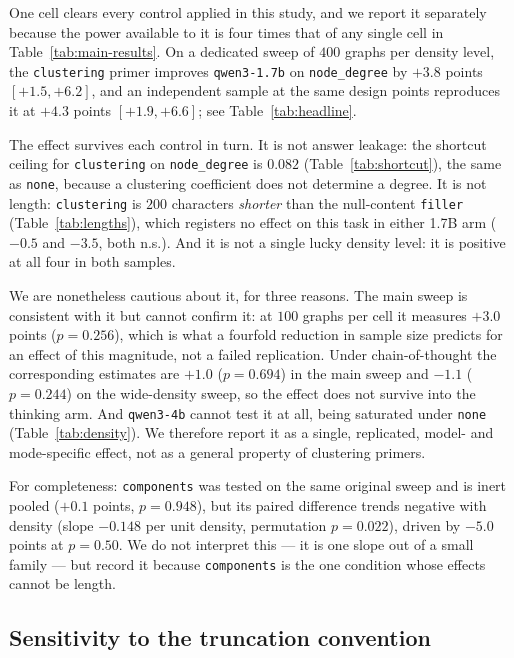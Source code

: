 \documentclass[11pt]{article}
\begin{document}
One cell clears every control applied in this study, and we report it
separately because the power available to it is four times that of any
single cell in Table~\ref{tab:main-results}. On a dedicated sweep of $400$
graphs per density level, the \texttt{clustering} primer improves
\texttt{qwen3-1.7b} on \texttt{node\_degree} by $+3.8$ points $[+1.5,
+6.2]$, and an independent sample at the same design points reproduces it
at $+4.3$ points $[+1.9, +6.6]$; see Table~\ref{tab:headline}.

The effect survives each control in turn. It is not answer leakage: the
shortcut ceiling for \texttt{clustering} on \texttt{node\_degree} is
$0.082$ (Table~\ref{tab:shortcut}), the same as \texttt{none}, because a
clustering coefficient does not determine a degree. It is not length:
\texttt{clustering} is $200$ characters \emph{shorter} than the
null-content \texttt{filler} (Table~\ref{tab:lengths}), which registers no
effect on this task in either 1.7B arm ($-0.5$ and $-3.5$, both n.s.). And
it is not a single lucky density level: it is positive at all four in both
samples.

We are nonetheless cautious about it, for three reasons. The main sweep is
consistent with it but cannot confirm it: at $100$ graphs per cell it
measures $+3.0$ points ($p = 0.256$), which is what a fourfold reduction in
sample size predicts for an effect of this magnitude, not a failed
replication. Under chain-of-thought the corresponding estimates are $+1.0$
($p = 0.694$) in the main sweep and $-1.1$ ($p = 0.244$) on the
wide-density sweep, so the effect does not survive into the thinking arm.
And \texttt{qwen3-4b} cannot test it at all, being saturated under
\texttt{none} (Table~\ref{tab:density}). We therefore report it as a
single, replicated, model- and mode-specific effect, not as a general
property of clustering primers.

For completeness: \texttt{components} was tested on the same original
sweep and is inert pooled ($+0.1$ points, $p = 0.948$), but its paired
difference trends negative with density (slope $-0.148$ per unit density,
permutation $p = 0.022$), driven by $-5.0$ points at $p=0.50$. We do not
interpret this --- it is one slope out of a small family --- but record it
because \texttt{components} is the one condition whose effects cannot be
length.

\subsection{Sensitivity to the truncation convention}
\label{sec:results-sensitivity}
\end{document}
